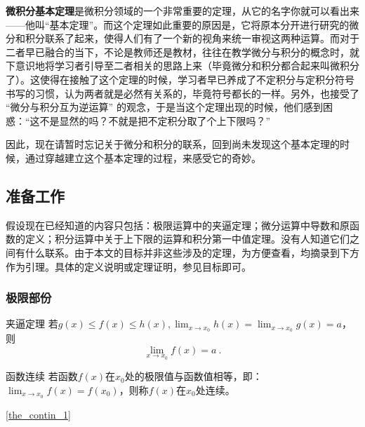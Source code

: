 
\begin{issues}
\issueTODO
\issueMissDepend
\issueNeedCite
\issueDraft
\end{issues}

\textbf{微积分基本定理}是微积分领域的一个非常重要的定理，从它的名字你就可以看出来——他叫“基本定理”。而这个定理如此重要的原因是，它将原本分开进行研究的微分和积分联系了起来，使得人们有了一个新的视角来统一审视这两种运算。而对于二者早已融合的当下，不论是教师还是教材，往往在教学微分与积分的概念时，就下意识地将学习者引导至二者相关的思路上来（毕竟微分和积分都合起来叫微积分了）。这使得在接触了这个定理的时候，学习者早已养成了不定积分与定积分符号书写的习惯，认为两者就是必然有关系的，毕竟符号都长的一样。另外，也接受了 “微分与积分互为逆运算” 的观念，于是当这个定理出现的时候，他们感到困惑：“这不是显然的吗？不就是把不定积分取了个上下限吗？”

因此，现在请暂时忘记关于微分和积分的联系，回到尚未发现这个基本定理的时候，通过穿越建立这个基本定理的过程，来感受它的奇妙。

\subsection{准备工作}

假设现在已经知道的内容只包括：极限运算中的夹逼定理；微分运算中导数和原函数的定义；积分运算中关于上下限的运算和积分第一中值定理。没有人知道它们之间有什么联系。由于本文的目标并非这些涉及的定理，为方便查看，均摘录到下方作为引理。具体的定义说明或定理证明，参见目标即可。

\subsubsection{极限部份}
\begin{lemma}{夹逼定理}\label{lem_FTcalc_3}
若$g(x)\leq f(x)\leq h(x),\lim _{x\to x_0}h(x)=\lim _{x\to x_0}g(x)=a$，则
$$\lim _{x\to x_0}f(x)=a~.$$
\end{lemma}

\begin{definition}{函数连续}\label{def_FTcalc_1}
若函数$f(x)$在$x_0$处的极限值与函数值相等，即：$\lim_{x\to x_0}f(x)=f(x_0)$，则称$f(x)$在$x_0$处连续。
\end{definition}
\autoref{the_contin_1}~
